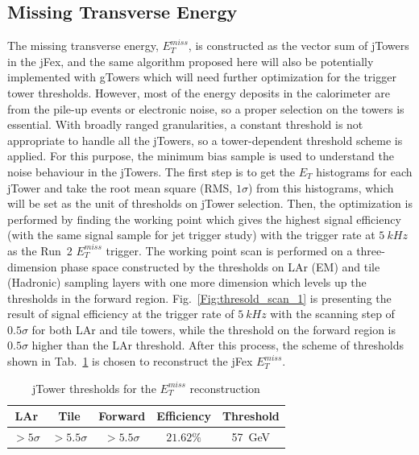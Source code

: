 \subsection{Missing Transverse Energy}
The missing transverse energy, $E^{miss}_{T}$, is constructed as the vector sum of jTowers in the jFex, and the same algorithm proposed here will also be potentially implemented with gTowers which will need further optimization for the trigger tower thresholds. However, most of the energy deposits in the calorimeter are from the pile-up events or electronic noise, so a proper selection on the towers is essential. With broadly ranged granularities, a constant threshold is not appropriate to handle all the jTowers, so a tower-dependent threshold scheme is applied. For this purpose, the minimum bias sample is used to understand the noise behaviour in the jTowers. The first step is to get the $E_{T}$ histograms for each jTower and take the root mean square (RMS, $1\sigma$) from this histograms, which will be set as the unit of thresholds on jTower selection. Then, the optimization is performed by finding the working point which gives the highest signal efficiency (with the same signal sample for jet trigger study) with the trigger rate at $5~kHz$ as the Run~2 $E^{miss}_{T}$ trigger. The working point scan is performed on a three-dimension phase space constructed by the thresholds on LAr (EM) and tile (Hadronic) sampling layers with one more dimension which levels up the thresholds in the forward region. Fig.~\ref{Fig:thresold_scan_1} is presenting the result of signal efficiency at the trigger rate of $5~kHz$ with the scanning step of $0.5\sigma$ for both LAr and tile towers, while the threshold on the forward region is $0.5\sigma$ higher than the LAr threshold. After this process, the scheme of thresholds shown in Tab.~\ref{Tab:cuts_met} is chosen to reconstruct the jFex $E^{miss}_{T}$.
\begin{table}[h]
	\caption{jTower thresholds for the $E^{miss}_{T}$ reconstruction}
	\renewcommand{\arraystretch}{1.3}
	\centering
	\begin{tabular}{| c | c | c | c | c |  }
		\hline
		\hline
		LAr             &    Tile         &     Forward       & Efficiency & Threshold   \\
		\hline
		$>5\sigma$       &    $>5.5\sigma$  &     $>5.5\sigma$   &  $21.62\%$  &  57~GeV  \\
		\hline
	\end{tabular}
	\label{Tab:cuts_met}
\end{table}
